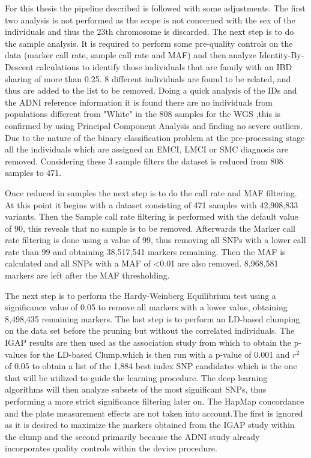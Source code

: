 For this thesis the pipeline described is followed with some adjustments. The first two analysis is not performed as the scope is not concerned with the sex of the individuals and thus the 23th chromosome is discarded. The next step is to do the sample analysis. It is required to perform some pre-quality controls on the data (marker call rate, sample call rate and MAF) and then analyze Identity-By-Descent calculations to identify those individuals that are family with an IBD sharing of more than 0.25. 8 different individuals are found to be related, and thus are added to the list to be removed. Doing a quick analysis of the IDs and the ADNI reference information it is found there are no individuals from populations different from "White" in the 808 samples for the WGS ,this is confirmed by using Principal Component Analysis and finding no severe outliers. Due to the nature of the binary classification problem at the pre-processing stage all the individuals which are assigned an EMCI, LMCI or SMC diagnosis are removed. Considering these 3 sample filters the dataset is reduced from 808 samples to 471.

Once reduced in samples the next step is to do the call rate and MAF filtering. At this point it begins with a dataset consisting of 471 samples with 42,908,833 variants. Then the Sample call rate filtering is performed with the default value of 90, this reveals that no sample is to be removed. Afterwards the Marker call rate filtering is done using a value of 99, thus removing all SNPs with a lower call rate than 99 and obtaining 38,517,541 markers remaining. Then the MAF is calculated and all SNPs with a MAF of <0.01 are also removed. 8,968,581 markers are left after the MAF thresholding.

 The next step is to perform the Hardy-Weinberg Equilibrium test using a significance value of 0.05 to remove all markers with a lower value, obtaining 8,498,435 remaining markers. The last step is to perform an LD-based clumping on the data set before the pruning but without the correlated individuals. The IGAP results are then used as the association study from which to obtain the p-values for the LD-based Clump,which is then run with a p-value of 0.001 and $r^2$ of 0.05 to obtain a list of the 1,884 best index SNP candidates which is the one that will be utilized to guide the learning procedure. The deep learning algorithms will then analyze subsets of the most significant SNPs, thus performing a more strict significance filtering later on. The HapMap concordance and the plate measurement effects are not taken into account.The first is ignored as it is desired to maximize the markers obtained from the IGAP study within the clump and the second primarily because the ADNI study already incorporates quality controls within the device procedure. 


